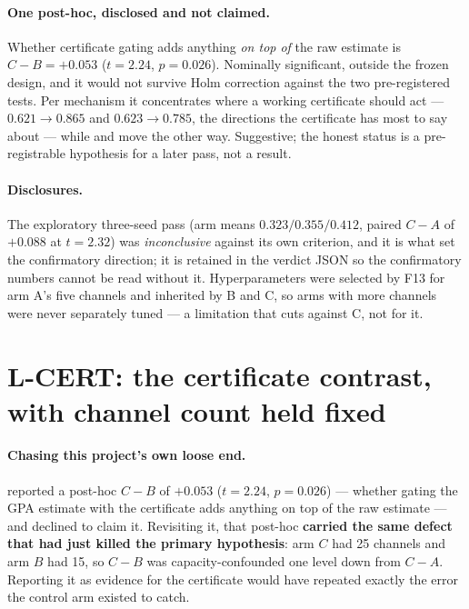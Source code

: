 \paragraph{One post-hoc, disclosed and not claimed.} Whether certificate gating adds anything
\emph{on top of} the raw estimate is $C - B = +0.053$ ($t = 2.24$, $p = 0.026$). Nominally
significant, outside the frozen design, and it would not survive Holm correction against the
two pre-registered tests. Per mechanism it concentrates where a working certificate should act
---  $0.621 \to 0.865$ and  $0.623 \to 0.785$, the
directions the certificate has most to say about --- while  and 
move the other way. Suggestive; the honest status is a pre-registrable hypothesis for a later
pass, not a result.

\paragraph{Disclosures.} The exploratory three-seed pass (arm means $0.323/0.355/0.412$, paired
$C-A$ of $+0.088$ at $t = 2.32$) was \emph{inconclusive} against its own criterion, and it is
what set the confirmatory direction; it is retained in the verdict JSON so the confirmatory
numbers cannot be read without it. Hyperparameters were selected by F13 for arm A's five
channels and inherited by B and C, so arms with more channels were never separately tuned ---
a limitation that cuts against C, not for it.

\section{L-CERT: the certificate contrast, with channel count held fixed}
\label{sec:f19-cert}

\paragraph{Chasing this project's own loose end.}  reported a post-hoc
$C - B$ of $+0.053$ ($t = 2.24$, $p = 0.026$) --- whether gating the GPA estimate with the
certificate adds anything on top of the raw estimate --- and declined to claim it. Revisiting
it, that post-hoc \textbf{carried the same defect that had just killed the primary
hypothesis}: arm $C$ had 25 channels and arm $B$ had 15, so $C - B$ was capacity-confounded one
level down from $C - A$. Reporting it as evidence for the certificate would have repeated
exactly the error the control arm existed to catch.

